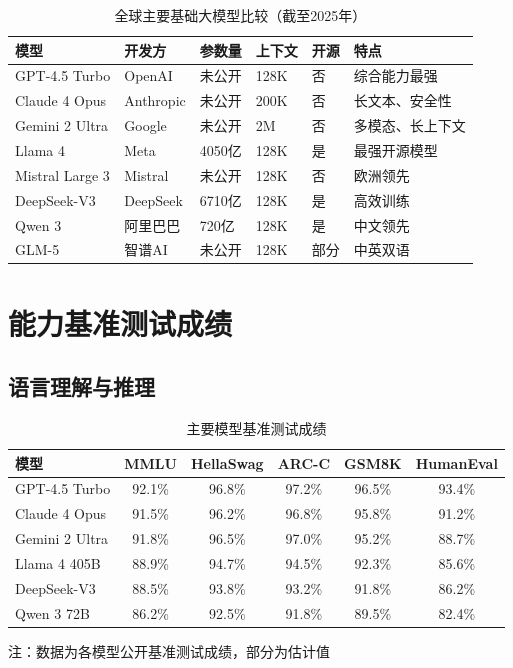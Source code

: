 \begin{table}[htbp]
  \centering
  \caption{全球主要基础大模型比较（截至2025年）}
  \small
  \begin{tabular}{|p{2.3cm}|p{1.8cm}|p{1.8cm}|p{1.4cm}|p{1.4cm}|p{2.3cm}|}
    \hline
    \textbf{模型} & \textbf{开发方} & \textbf{参数量} & \textbf{上下文} & \textbf{开源} & \textbf{特点} \\
    \hline
    GPT-4.5 Turbo & OpenAI & 未公开 & 128K & 否 & 综合能力最强 \\
    \hline
    Claude 4 Opus & Anthropic & 未公开 & 200K & 否 & 长文本、安全性 \\
    \hline
    Gemini 2 Ultra & Google & 未公开 & 2M & 否 & 多模态、长上下文 \\
    \hline
    Llama 4 & Meta & 4050亿 & 128K & 是 & 最强开源模型 \\
    \hline
    Mistral Large 3 & Mistral & 未公开 & 128K & 否 & 欧洲领先 \\
    \hline
    DeepSeek-V3 & DeepSeek & 6710亿 & 128K & 是 & 高效训练 \\
    \hline
    Qwen 3 & 阿里巴巴 & 720亿 & 128K & 是 & 中文领先 \\
    \hline
    GLM-5 & 智谱AI & 未公开 & 128K & 部分 & 中英双语 \\
    \hline
  \end{tabular}
\end{table}

\section{能力基准测试成绩}

\subsection{语言理解与推理}

\begin{table}[htbp]
  \centering
  \caption{主要模型基准测试成绩}
  \begin{tabular}{|l|c|c|c|c|c|}
    \hline
    \textbf{模型} & \textbf{MMLU} & \textbf{HellaSwag} & \textbf{ARC-C} & \textbf{GSM8K} & \textbf{HumanEval} \\
    \hline
    GPT-4.5 Turbo & 92.1\% & 96.8\% & 97.2\% & 96.5\% & 93.4\% \\
    Claude 4 Opus & 91.5\% & 96.2\% & 96.8\% & 95.8\% & 91.2\% \\
    Gemini 2 Ultra & 91.8\% & 96.5\% & 97.0\% & 95.2\% & 88.7\% \\
    Llama 4 405B & 88.9\% & 94.7\% & 94.5\% & 92.3\% & 85.6\% \\
    DeepSeek-V3 & 88.5\% & 93.8\% & 93.2\% & 91.8\% & 86.2\% \\
    Qwen 3 72B & 86.2\% & 92.5\% & 91.8\% & 89.5\% & 82.4\% \\
    \hline
  \end{tabular}
  
  
\small 注：数据为各模型公开基准测试成绩，部分为估计值
\end{table}

